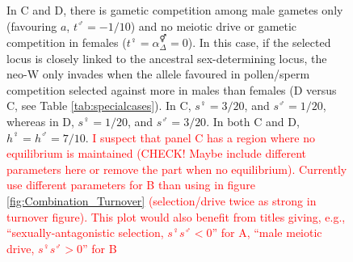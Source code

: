 \documentclass[12pt]{article}
\begin{document}
\begin{figure}[!h]
{In C and D, there is gametic competition among male gametes only (favouring $a$, $t^\male=-1/10$) and no meiotic drive or gametic competition in females ($t^\female=\alpha^\Hermaphrodite_{\Delta}=0$). 
In this case, if the selected locus is closely linked to the ancestral sex-determining locus, the neo-W only invades when the allele favoured in pollen/sperm competition selected against more in males than females (D versus C, see Table \ref{tab:specialcases}). In C, $s^\female=3/20$, and $s^\male=1/20$, whereas in D, $s^\female=1/20$, and $s^\male=3/20$. In both C and D, $h^\female=h^\male=7/10$.
\textcolor{red}{I suspect that panel C has a region where no equilibrium is maintained (CHECK! Maybe include different parameters here or remove the part when no equilibrium). Currently use different parameters for B than using in figure \ref{fig:Combination_Turnover} (selection/drive twice as strong in turnover figure). This plot would also benefit from titles giving, e.g., ``sexually-antagonistic selection, $s^\female s^\male<0$'' for A, ``male meiotic drive, $s^\female s^\male>0$'' for B}
}
\label{fig:Combination_Centimorgans}
\end{figure}
\newpage


\end{document}
